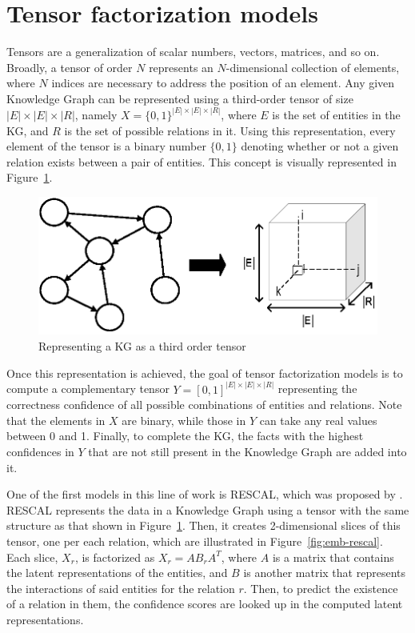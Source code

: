 \section{Tensor factorization models}\label{sec:emb-tensors}
Tensors are a generalization of scalar numbers, vectors, matrices, and so on. Broadly, a tensor of order $N$ represents an $N$-dimensional collection of elements, where $N$ indices are necessary to address the position of an element. Any given Knowledge Graph can be represented using a third-order tensor of size $|E| \times |E| \times |R|$, namely $X = \{0, 1\}^{|E| \times |E| \times |R|}$, where $E$ is the set of entities in the KG, and $R$ is the set of possible relations in it. Using this representation, every element of the tensor is a binary number $\{0, 1\}$ denoting whether or not a given relation exists between a pair of entities. This concept is visually represented in Figure~\ref{fig:emb-kg2tensor}.

\begin{figure}[!htp]
    \centering
    \includegraphics[width=.9\textwidth]{fig/embedding/kg2tensor}
    \caption{Representing a KG as a third order tensor}
    \label{fig:emb-kg2tensor}
\end{figure}

Once this representation is achieved, the goal of tensor factorization models is to compute a complementary tensor $Y = [0, 1]^{|E| \times |E| \times |R|}$ representing the correctness confidence of all possible combinations of entities and relations. Note that the elements in $X$ are binary, while those in $Y$ can take any real values between 0 and 1. Finally, to complete the KG, the facts with the highest confidences in $Y$ that are not still present in the Knowledge Graph are added into it.

One of the first models in this line of work is RESCAL, which was proposed by \citet{nickel2011}. RESCAL represents the data in a Knowledge Graph using a tensor with the same structure as that shown in Figure~\ref{fig:emb-kg2tensor}. Then, it creates 2-dimensional slices of this tensor, one per each relation, which are illustrated in Figure~\ref{fig:emb-rescal}. Each slice, $X_r$, is factorized as $X_r = AB_{r}A^{T}$, where $A$ is a matrix that contains the latent representations of the entities, and $B$ is another matrix that represents the interactions of said entities for the relation $r$. Then, to predict the existence of a relation in them, the confidence scores are looked up in the computed latent representations.

